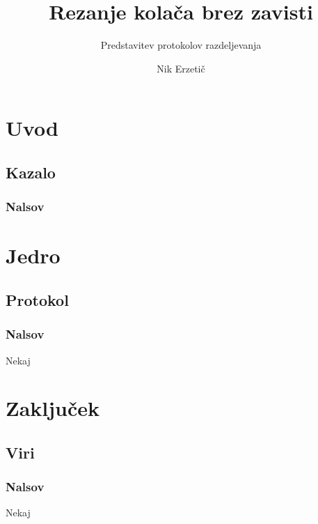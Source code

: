\documentclass{beamer}
\title{\textbf{Rezanje kolača brez zavisti}}
\subtitle{Predstavitev protokolov razdeljevanja}
\author{Nik Erzetič}
\institute[FMF]{\centering \texttt{[image: UL-Fakulteta-za-matematiko-in-fiziko.jpg]}}
\date{}
\begin{document}
	
	\begin{frame}[plain]
		\titlepage
	\end{frame}

	\section{Uvod}
	\subsection{Kazalo}
	
	\begin{frame}
		\frametitle{Nalsov}
		\tableofcontents
	\end{frame}

	\section{Jedro}
	\subsection{Protokol}
	
	\begin{frame}
	\frametitle{Nalsov}
	Nekaj
	\end{frame}

	\section{Zaključek}
	\subsection{Viri}
	
	\begin{frame}
		\frametitle{Nalsov}
		Nekaj
	\end{frame}
\end{document}
